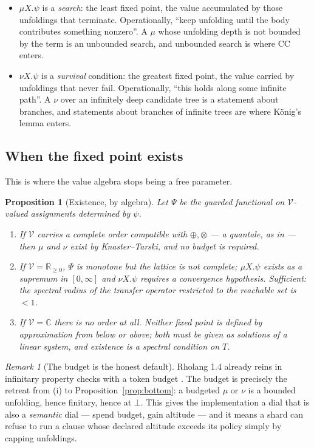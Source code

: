 \documentclass[11pt]{article}
\theoremstyle{definition}
\theoremstyle{plain}
\newtheorem{proposition}{Proposition}
\theoremstyle{remark}
\newtheorem{remark}{Remark}
\newcommand{\V}{\mathcal{V}}
\newcommand{\sumv}{\oplus}
\newcommand{\tensorv}{\otimes}
\newcommand{\Rnn}{\mathbb{R}_{\geq 0}}
\newcommand{\Cx}{\mathbb{C}}
\newcommand{\CC}{\mathrm{CC}}
\begin{document}
\begin{itemize}[leftmargin=1.4em,itemsep=3pt]
\item $\mu X.\psi$ is a \emph{search}: the least fixed point, the value accumulated by
those unfoldings that terminate. Operationally, ``keep unfolding until the body
contributes something nonzero''. A $\mu$ whose unfolding depth is not bounded by the
term is an unbounded search, and unbounded search is where $\CC$ enters.
\item $\nu X.\psi$ is a \emph{survival} condition: the greatest fixed point, the value
carried by unfoldings that never fail. Operationally, ``this holds along some
infinite path''. A $\nu$ over an infinitely deep candidate tree is a statement about
branches, and statements about branches of infinite trees are where K\"onig's lemma
enters.
\end{itemize}

\subsection{When the fixed point exists}

This is where the value algebra stops being a free parameter.

\begin{proposition}[Existence, by algebra]\label{prop:exists}
Let $\Psi$ be the guarded functional on $\V$-valued assignments determined by
$\psi$.
\begin{enumerate}[label=(\roman*),leftmargin=2.2em,itemsep=2pt]
\item If $\V$ carries a complete order compatible with $\sumv,\tensorv$ --- a quantale,
as in \cite{fuzzyrho} --- then $\mu$ and $\nu$ exist by Knaster--Tarski, and no budget
is required.
\item If $\V = \Rnn$, $\Psi$ is monotone but the lattice is not complete;
$\mu X.\psi$ exists as a supremum in $[0,\infty]$ and $\nu X.\psi$ requires a
convergence hypothesis. Sufficient: the spectral radius of the transfer operator
restricted to the reachable set is $< 1$.
\item If $\V = \Cx$ there is no order at all. Neither fixed point is defined by
approximation from below or above; both must be given as solutions of a linear
system, and existence is a spectral condition on $T$.
\end{enumerate}
\end{proposition}

\begin{remark}[The budget is the honest default]\label{rem:budget}
Rholang 1.4 already reins in infinitary property checks with a token budget
\cite{omnibus}. The budget is precisely the retreat from (i) to
Proposition~\ref{prop:bottom}: a budgeted $\mu$ or $\nu$ is a bounded unfolding, hence
finitary, hence at $\bot$. This gives the implementation a dial that is also a
\emph{semantic} dial --- spend budget, gain altitude --- and it means a shard can
refuse to run a clause whose declared altitude exceeds its policy simply by capping
unfoldings.
\end{remark}
\end{document}
